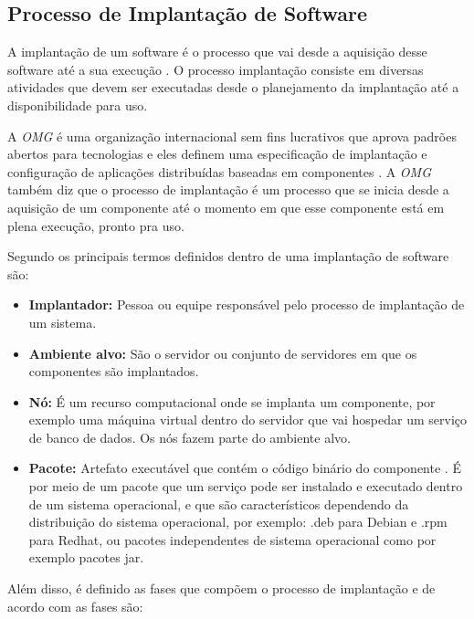 \subsection{Processo de Implantação de Software}

A implantação de um software é o processo que vai desde a aquisição desse software
até a sua execução \cite{leo2014}. O processo implantação consiste em diversas
atividades que devem ser executadas desde o planejamento da implantação até a
disponibilidade para uso.

A \textit{OMG} é uma organização internacional sem fins lucrativos
que aprova padrões abertos para tecnologias e eles definem uma especificação de
implantação e configuração de aplicações distribuídas baseadas em componentes \cite{omg2006}. 
A \textit{OMG} também diz que o processo de implantação é um processo que se inicia desde
a aquisição de um componente até o momento em que esse componente está em plena
execução, pronto pra uso.

Segundo  os principais termos definidos dentro de uma implantação
de software são:

\begin{itemize}
  \item  \textbf{Implantador:} Pessoa ou equipe responsável pelo processo de
  implantação  de um sistema.
  \item  \textbf{Ambiente alvo:} São o servidor ou conjunto de servidores em
  que os componentes são implantados.
  \item  \textbf{Nó:} É um recurso computacional onde se implanta um componente,
  por exemplo uma máquina virtual dentro do servidor que vai hospedar um serviço
  de banco de dados. Os nós fazem parte do ambiente alvo.
  \item  \textbf{Pacote:} Artefato executável que contém o código binário do componente
  . É por meio de um pacote que um serviço pode ser instalado e executado dentro
  de um sistema operacional, e que são característicos dependendo da distribuição
  do sistema operacional, por exemplo: .deb para Debian e .rpm para Redhat, ou
  pacotes independentes de sistema operacional como por exemplo pacotes jar.
\end{itemize}

Além disso, é definido as fases que compõem o processo de implantação e de acordo
com  as fases são:


